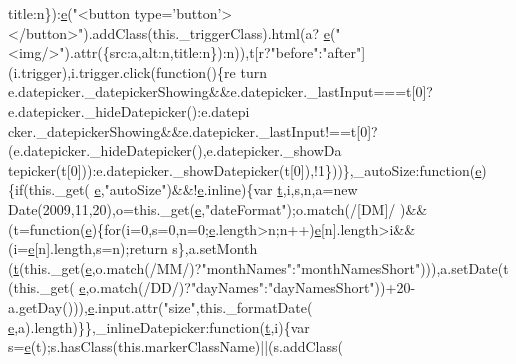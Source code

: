 \begin{DoxyCode}
      title:n\}):\hyperlink{jquery-ui_8min_8js_a2c038346d47955cbe2cb91e338edd7e1}{e}(\textcolor{stringliteral}{"<button type='button'></button>"}).addClass(this.\_triggerClass).html(a?
      \hyperlink{jquery-ui_8min_8js_a2c038346d47955cbe2cb91e338edd7e1}{e}(\textcolor{stringliteral}{"<img/>"}).attr(\{src:a,alt:n,title:n\}):n)),t[r?\textcolor{stringliteral}{"before"}:\textcolor{stringliteral}{"after"}](i.trigger),i.trigger.click(\textcolor{keyword}{function}()\{re
      turn e.datepicker.\_datepickerShowing&&e.datepicker.\_lastInput===t[0]?e.datepicker.\_hideDatepicker():e.datepi
      cker.\_datepickerShowing&&e.datepicker.\_lastInput!==t[0]?(e.datepicker.\_hideDatepicker(),e.datepicker.\_showDa
      tepicker(t[0])):e.datepicker.\_showDatepicker(t[0]),!1\}))\},\_autoSize:\textcolor{keyword}{function}(\hyperlink{jquery-ui_8min_8js_a2c038346d47955cbe2cb91e338edd7e1}{e})\{\textcolor{keywordflow}{if}(this.\_get(
      \hyperlink{jquery-ui_8min_8js_a2c038346d47955cbe2cb91e338edd7e1}{e},\textcolor{stringliteral}{"autoSize"})&&!\hyperlink{jquery-ui_8min_8js_a2c038346d47955cbe2cb91e338edd7e1}{e}.inline)\{var \hyperlink{jquery-2_80_83_8min_8js_aaccc9105df5383111407fd5b41255e23}{t},i,s,n,a=\textcolor{keyword}{new} Date(2009,11,20),o=this.\_get(\hyperlink{jquery-ui_8min_8js_a2c038346d47955cbe2cb91e338edd7e1}{e},\textcolor{stringliteral}{"dateFormat"});o.match(/[DM]/
      )&&(t=\textcolor{keyword}{function}(\hyperlink{jquery-ui_8min_8js_a2c038346d47955cbe2cb91e338edd7e1}{e})\{\textcolor{keywordflow}{for}(i=0,s=0,n=0;\hyperlink{jquery-ui_8min_8js_a2c038346d47955cbe2cb91e338edd7e1}{e}.length>n;n++)\hyperlink{jquery-ui_8min_8js_a2c038346d47955cbe2cb91e338edd7e1}{e}[n].length>i&&(i=\hyperlink{jquery-ui_8min_8js_a2c038346d47955cbe2cb91e338edd7e1}{e}[n].length,s=n);\textcolor{keywordflow}{return} s\},a.setMonth
      (\hyperlink{jquery-2_80_83_8min_8js_aaccc9105df5383111407fd5b41255e23}{t}(this.\_get(\hyperlink{jquery-ui_8min_8js_a2c038346d47955cbe2cb91e338edd7e1}{e},o.match(/MM/)?\textcolor{stringliteral}{"monthNames"}:\textcolor{stringliteral}{"monthNamesShort"}))),a.setDate(t(this.\_get(
      \hyperlink{jquery-ui_8min_8js_a2c038346d47955cbe2cb91e338edd7e1}{e},o.match(/DD/)?\textcolor{stringliteral}{"dayNames"}:\textcolor{stringliteral}{"dayNamesShort"}))+20-a.getDay())),\hyperlink{jquery-ui_8min_8js_a2c038346d47955cbe2cb91e338edd7e1}{e}.input.attr(\textcolor{stringliteral}{"size"},this.\_formatDate(
      \hyperlink{jquery-ui_8min_8js_a2c038346d47955cbe2cb91e338edd7e1}{e},a).length)\}\},\_inlineDatepicker:\textcolor{keyword}{function}(\hyperlink{jquery-2_80_83_8min_8js_aaccc9105df5383111407fd5b41255e23}{t},i)\{var s=\hyperlink{jquery-ui_8min_8js_a2c038346d47955cbe2cb91e338edd7e1}{e}(t);s.hasClass(this.markerClassName)||(s.addClass(

\end{DoxyCode}
